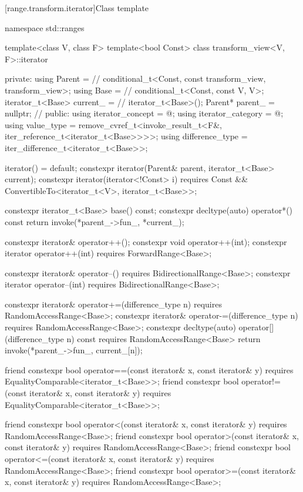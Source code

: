 [range.transform.iterator]{Class template }

\begin{codeblock}
namespace std::ranges {
  template<class V, class F>
  template<bool Const>
  class transform_view<V, F>::iterator {
  private:
    using Parent =                              // \expos
      conditional_t<Const, const transform_view, transform_view>;
    using Base   =                              // \expos
      conditional_t<Const, const V, V>;
    iterator_t<Base> current_ =                 // \expos
      iterator_t<Base>();
    Parent* parent_ = nullptr;                  // \expos
  public:
    using iterator_concept  = @\seebelow@;
    using iterator_category = @\seebelow@;
    using value_type        =
      remove_cvref_t<invoke_result_t<F&, iter_reference_t<iterator_t<Base>>>>;
    using difference_type   = iter_difference_t<iterator_t<Base>>;

    iterator() = default;
    constexpr iterator(Parent& parent, iterator_t<Base> current);
    constexpr iterator(iterator<!Const> i)
      requires Const && ConvertibleTo<iterator_t<V>, iterator_t<Base>>;

    constexpr iterator_t<Base> base() const;
    constexpr decltype(auto) operator*() const
    { return invoke(*parent_->fun_, *current_); }

    constexpr iterator& operator++();
    constexpr void operator++(int);
    constexpr iterator operator++(int) requires ForwardRange<Base>;

    constexpr iterator& operator--() requires BidirectionalRange<Base>;
    constexpr iterator operator--(int) requires BidirectionalRange<Base>;

    constexpr iterator& operator+=(difference_type n)
      requires RandomAccessRange<Base>;
    constexpr iterator& operator-=(difference_type n)
      requires RandomAccessRange<Base>;
    constexpr decltype(auto) operator[](difference_type n) const
      requires RandomAccessRange<Base>
    { return invoke(*parent_->fun_, current_[n]); }

    friend constexpr bool operator==(const iterator& x, const iterator& y)
      requires EqualityComparable<iterator_t<Base>>;
    friend constexpr bool operator!=(const iterator& x, const iterator& y)
      requires EqualityComparable<iterator_t<Base>>;

    friend constexpr bool operator<(const iterator& x, const iterator& y)
      requires RandomAccessRange<Base>;
    friend constexpr bool operator>(const iterator& x, const iterator& y)
      requires RandomAccessRange<Base>;
    friend constexpr bool operator<=(const iterator& x, const iterator& y)
      requires RandomAccessRange<Base>;
    friend constexpr bool operator>=(const iterator& x, const iterator& y)
      requires RandomAccessRange<Base>;

}}
\end{codeblock}
